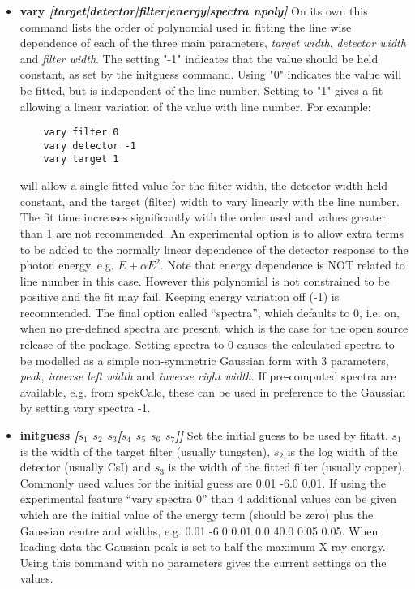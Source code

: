 \documentclass[a4paper,12pt]{article}
\begin{document}
\begin{itemize}
\item{\bf vary \it{[target|detector|filter|energy|spectra npoly]}} On its own this command lists the order of polynomial used in fitting the line wise
dependence of each of the three main parameters, \textit{target width},
\textit{detector width} and \textit{filter width}.
The setting "-1" indicates that the value should be held constant, as set by the initguess command.
Using "0" indicates the value will be fitted, but is independent of the line number.
Setting to "1" gives a fit allowing a linear variation of the value with line number.
For example:
\begin{verbatim}
    vary filter 0
    vary detector -1
    vary target 1
\end{verbatim}
will allow a single fitted value for the filter width, the detector width held constant, and
the target (filter) width to vary linearly with the line number. 
The fit time increases significantly with the order used and values greater than 1 are not recommended.
An experimental option is to allow extra terms to be added to the normally linear dependence of the detector response to the photon energy,
e.g. $E+\alpha E^2$.
Note that energy dependence is NOT related to line number in this case.
However this polynomial is not constrained to be positive and the fit may fail.
Keeping energy variation off (-1) is recommended.
The final option called ``spectra'', which defaults to 0, i.e. on, when no pre-defined
spectra are present, which is the case for the open source release of the package.
Setting spectra to 0 causes the calculated spectra to be modelled as a simple non-symmetric Gaussian form with 3 parameters,
\textit{peak}, \textit{inverse left width} and \textit{inverse right width}.
If pre-computed spectra are available, e.g. from spekCalc, these can be used in preference to the
Gaussian by setting vary spectra -1.

\item{\bf initguess \it{[$s_1$ $s_2$ $s_3$}[$s_4$ $s_5$ $s_6$ $s_7$]]} Set the initial guess to be used by fitatt.
$s_1$ is the width of the target filter (usually tungsten), $s_2$ is the log width of the detector (usually CsI) and $s_3$ is the width of the
fitted filter (usually copper). Commonly used values for the initial guess are 0.01 -6.0 0.01.
If using the experimental feature ``vary spectra 0'' than 4 additional values can be given which are the initial value of the
energy term (should be zero) plus the Gaussian centre and widths, e.g. 0.01 -6.0 0.01 0.0 40.0 0.05 0.05.
When loading data the Gaussian peak is set to half the maximum X-ray energy.
Using this command with no parameters gives the current settings on the values.


\end{itemize}
\end{document}

